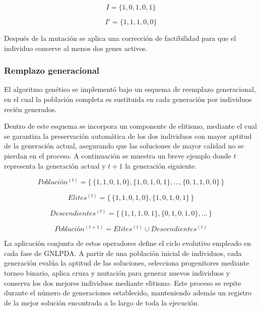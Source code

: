 \begin{equation}
	I = \{1,0,1,0,1\}
\end{equation}

\begin{equation}
	I' = \{1,1,1,0,0\}
\end{equation}

Después de la mutación se aplica una corrección de factibilidad para que el individuo conserve al menos dos genes activos.


\subsubsection{Remplazo generacional}

El algoritmo genético se implementó bajo un esquema de reemplazo generacional, en el cual la población completa es sustituida en cada generación por individuos recién generados. 

Dentro de  este esquema se incorpora un componente de elitismo, mediante el cual se garantiza la preservación automática de los dos individuos con mayor aptitud de la generación actual, asegurando que las soluciones de mayor calidad no se pierdan en el proceso. A continuación se muestra un breve ejemplo donde $t$ representa la generación actual y $t+1$ la generación siguiente.

\begin{equation}
	Poblaci\text{ó}n^{(t)} = 
	\{\, \{1,1,0,1,0\}, \{1,0,1,0,1\}, \ldots, \{0,1,1,0,0\} \,\}
\end{equation}

\begin{equation}
	Elites^{(t)} = \{\, \{1,1,0,1,0\}, \{1,0,1,0,1\} \,\}
\end{equation}

\begin{equation}
	Descendientes^{(t)} = \{\, \{1,1,1,0,1\}, \{0,1,0,1,0\}, \ldots \,\}
\end{equation}

\begin{equation}
	Poblaci\text{ó}n^{(t+1)} = Elites^{(t)} \cup Descendientes^{(t)}
	\label{eq:EMN4}
\end{equation}


La aplicación conjunta de estos operadores define el ciclo evolutivo empleado en cada fase de GNLPDA. A partir de una población inicial de individuos, cada generación evalúa la aptitud de las soluciones, selecciona progenitores mediante torneo binario, aplica cruza y mutación para generar nuevos individuos y conserva los dos mejores individuos mediante elitismo. Este proceso se repite durante el número de generaciones establecido, manteniendo además un registro de la mejor solución encontrada a lo largo de toda la ejecución.

